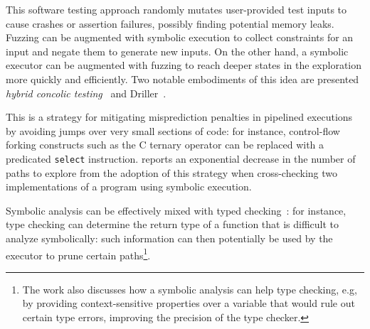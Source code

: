 This software testing approach randomly mutates user-provided test inputs to cause crashes or assertion failures, possibly finding potential memory leaks. Fuzzing can be augmented with symbolic execution to collect constraints for an input and negate them to generate new inputs. On the other hand, a symbolic executor can be augmented with fuzzing to reach deeper states in the exploration more quickly and efficiently. Two notable embodiments of this idea are presented {\em hybrid concolic testing}~\cite{RK-ICSE07} and Driller~\cite{DRILLER-NDSS16}.


 This is a strategy for mitigating misprediction penalties in pipelined executions by avoiding jumps over very small sections of code: for instance, control-flow forking constructs such as the C ternary operator can be replaced with a predicated {\tt select} instruction. \cite{CCK-EUROSYS11} reports an exponential decrease in the number of paths to explore from the adoption of this strategy when cross-checking two implementations of a program using symbolic execution. %

 Symbolic analysis can be effectively mixed with typed checking~\cite{KCF-PLDI10}:  for instance, type checking can determine the return type of a function that is difficult to analyze symbolically: such information can then potentially be used by the executor to prune certain paths\footnote{The work also discusses how a symbolic analysis can help type checking, e.g, by providing context-sensitive properties over a variable that would rule out certain type errors, improving the precision of the type checker.}.


